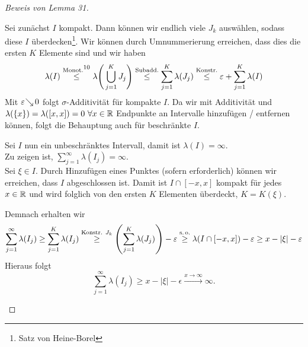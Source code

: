 \documentclass[skript.tex]{subfiles}
\begin{document}
\begin{proof}[Beweis von Lemma 31]
\begin{enumerate}[(a)]
					Sei zunächst $I$ kompakt. Dann können wir endlich viele $J_k$ auswählen,
					sodass diese $I$ überdecken\footnote[11]{Satz von Heine-Borel}.
					Wir können durch Umnummerierung erreichen, dass dies die ersten $K$ Elemente 
					sind und wir haben
					\[	
						\lambda(I) \overset{\text{Monot.}\footnotemark[10]}{\leq}
						\lambda{\Bigg(\bigcup_{j=1}^K J_j\Bigg)} \overset{\text{Subadd.}}{\leq}
						\sum_{j=1}^K \lambda(J_j)  \overset{\text{Konstr.}}{\leq}
						\epsilon + \sum_{j=1}^K \lambda(I)
					\]
					Mit $\epsilon \searr 0$ folgt $\sigma$-Additivität für kompakte $I$.
					Da wir mit Additivität und \\ $\lambda(\{x\}) = \lambda([x,x]) = 0 \ 
					\forall x \in \mbb{R}$ Endpunkte an Intervalle hinzufügen / entfernen können,
					folgt die Behauptung auch für beschränkte $I$.
					
					Sei $I$ nun ein unbeschränktes Intervall, damit ist $\lambda(I) = \infty$. \\
					Zu zeigen ist, $\sum_{j=1}^\infty \lambda(I_j) = \infty$. \\
					Sei $\xi \in I$. Durch Hinzufügen eines Punktes (sofern erforderlich) können wir
					erreichen, dass $I$ abgeschlossen ist. Damit ist $I \cap [-x,x]$ kompakt für jedes
					$x \in \mbb{R}$ und wird folglich von den ersten $K$ Elementen überdeckt,
					$K = K(\xi)$.
					
					Demnach erhalten wir
					\[
						\sum_{j=1}^\infty \lambda(I_j) \geq \sum_{j=1}^K \lambda(I_j)
						 \overset{\text{Konstr. } J_k}{\geq} \left(\sum_{j=1}^K \lambda(J_j)\right)
						 -\epsilon \overset{\text{s.\,o.}}{\geq} \lambda(I \cap [-x,x]) -\epsilon
						 \geq x - \lvert\xi\rvert - \epsilon
					\]
					Hieraus folgt
					\[
						\sum_{j=1}^\infty \lambda(I_j) \geq x - \lvert\xi\rvert - \epsilon
						\xrightarrow{x \to \infty} \infty.
					\]
			\end{enumerate}
		\end{proof}
			
\end{document}
